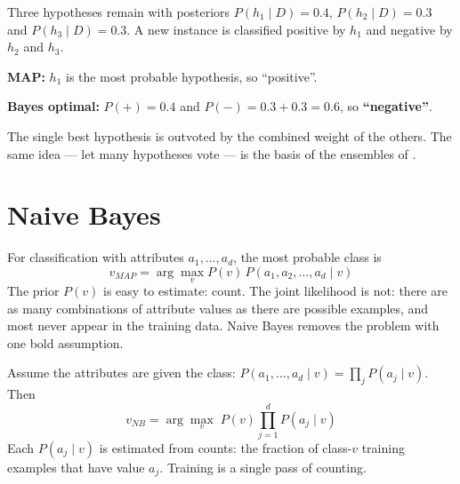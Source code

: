 \begin{worked}
Three hypotheses remain with posteriors $P(h_1 \mid D) = 0.4$, $P(h_2 \mid D) = 0.3$
and $P(h_3 \mid D) = 0.3$. A new instance is classified positive by $h_1$ and negative
by $h_2$ and $h_3$.
\begin{tight}
  \item \textbf{MAP:} $h_1$ is the most probable hypothesis, so ``positive''.
  \item \textbf{Bayes optimal:} $P(+) = 0.4$ and $P(-) = 0.3 + 0.3 = 0.6$, so
        \textbf{``negative''}.
\end{tight}
The single best hypothesis is outvoted by the combined weight of the others. The
same idea --- let many hypotheses vote --- is the basis of the ensembles of
.
\end{worked}

\section{Naive Bayes}

For classification with attributes $a_1, \dots, a_d$, the most probable class is
\[
v_{MAP} = \arg\max_{v} P(v)\,P(a_1, a_2, \dots, a_d \mid v)
\]
The prior $P(v)$ is easy to estimate: count. The joint likelihood is not: there are
as many combinations of attribute values as there are possible examples, and most
never appear in the training data. Naive Bayes removes the problem with one bold
assumption.

\begin{definitionbox}
Assume the attributes are  given the class:
$P(a_1, \dots, a_d \mid v) = \prod_j P(a_j \mid v)$. Then
\[
v_{NB} = \arg\max_{v}\; P(v)\prod_{j=1}^{d} P(a_j \mid v)
\]
Each $P(a_j \mid v)$ is estimated from counts: the fraction of class-$v$ training
examples that have value $a_j$. Training is a single pass of counting.
\end{definitionbox}

